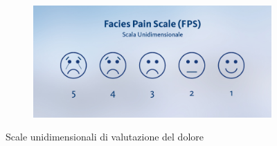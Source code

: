 \begin{figure}[H]
\begin{subfigure}[b]{0.5\textwidth}
\end{subfigure}
\begin{subfigure}[b]{0.5\textwidth}
    \includegraphics[width=\linewidth]{img/FACCINE.jpeg}
    \caption{}
    
\end{subfigure}
    \caption{Scale unidimensionali di valutazione del dolore\cite{SCALEDOLORE}}
    \label{fig:FIGURE_5.8}
    
\end{figure}

